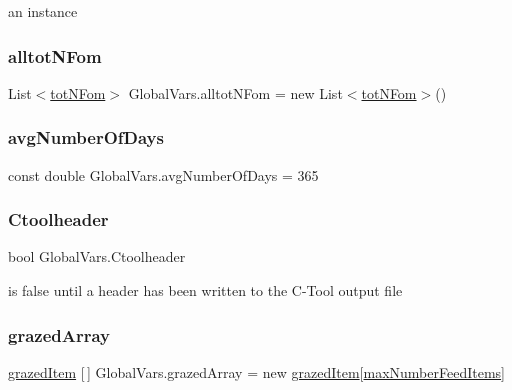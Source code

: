 an instance 

\mbox{\label{class_global_vars_a2572f02893208587743e907ff7662914}} 
\subsubsection{\texorpdfstring{alltotNFom}{alltotNFom}}
{\footnotesize\ttfamily List$<$\mbox{\hyperlink{struct_global_vars_1_1tot_n_fom}{tot\+N\+Fom}}$>$ Global\+Vars.\+alltot\+N\+Fom = new List$<$\mbox{\hyperlink{struct_global_vars_1_1tot_n_fom}{tot\+N\+Fom}}$>$()}

\mbox{\label{class_global_vars_a7d5c0478f453bab8cc1d05aac2539ee0}} 
\subsubsection{\texorpdfstring{avgNumberOfDays}{avgNumberOfDays}}
{\footnotesize\ttfamily const double Global\+Vars.\+avg\+Number\+Of\+Days = 365}

\mbox{\label{class_global_vars_a0b8860093c80385ce3a6d8c590f3023c}} 
\subsubsection{\texorpdfstring{Ctoolheader}{Ctoolheader}}
{\footnotesize\ttfamily bool Global\+Vars.\+Ctoolheader}



is false until a header has been written to the C-\/\+Tool output file 

\mbox{\label{class_global_vars_a72d7a0bc05f7dd554854b67127849e5b}} 
\subsubsection{\texorpdfstring{grazedArray}{grazedArray}}
{\footnotesize\ttfamily \mbox{\hyperlink{struct_global_vars_1_1grazed_item}{grazed\+Item}} \mbox{[}$\,$\mbox{]} Global\+Vars.\+grazed\+Array = new \mbox{\hyperlink{struct_global_vars_1_1grazed_item}{grazed\+Item}}\mbox{[}\mbox{\hyperlink{class_global_vars_a42fa58d4be2a863e36b4ec8e8bee69cd}{max\+Number\+Feed\+Items}}\mbox{]}}



